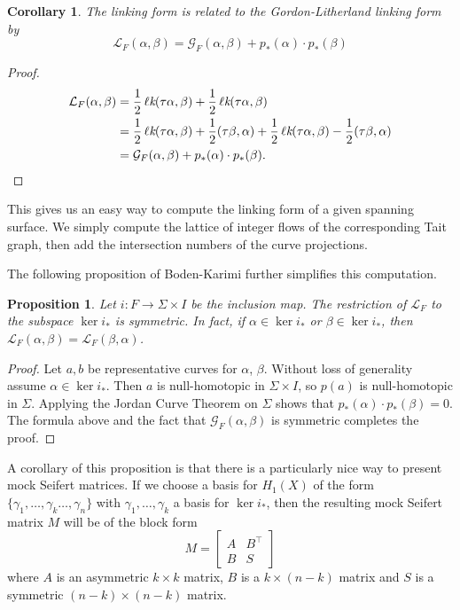 \documentclass[12pt]{report}
\newcommand{\lk}{\operatorname{\ell\textit{k}}}
\newtheorem*{proposition}{Proposition}
\newtheorem*{corollary}{Corollary}
\theoremstyle{upright}
\begin{document}
\begin{corollary}
The linking form is related to the Gordon-Litherland linking form by
\[\mathcal{L}_{F}(\alpha, \beta) = \mathcal{G}_{F}(\alpha, \beta) + p_{*}(\alpha) \cdot p_{*}(\beta)\]
\end{corollary}

\begin{proof}
\begin{align*}
\mathcal{L}_{F}(\alpha, \beta) & = \dfrac{1}{2}\lk(\tau \alpha, \beta) + \dfrac{1}{2}\lk(\tau \alpha, \beta)\\
& = \dfrac{1}{2}\lk(\tau \alpha, \beta) + \dfrac{1}{2}(\tau \beta, \alpha) + \dfrac{1}{2}\lk(\tau \alpha, \beta) - \dfrac{1}{2}(\tau \beta, \alpha)\\
& = \mathcal{G}_{F}(\alpha, \beta) + p_{*}(\alpha) \cdot p_{*}(\beta). \qedhere
\end{align*}
\end{proof}

This gives us an easy way to compute the linking form of a given spanning surface. We simply compute the lattice of integer flows of the corresponding Tait graph, then add the intersection numbers of the curve projections.

The following proposition of Boden-Karimi \cite[Remark 3.2]{mock-seifert-matrices} further simplifies this computation.

\begin{proposition}
	Let $i: F \longrightarrow \Sigma \times I$ be the inclusion map. The restriction of $\mathcal{L}_{F}$ to the subspace $\ker i_{*}$ is symmetric. In fact, if $\alpha \in \ker i_{*}$ or $\beta \in \ker i_{*}$, then $\mathcal{L}_{F}(\alpha, \beta) = \mathcal{L}_{F}(\beta, \alpha)$.
\end{proposition}

\begin{proof}
	Let $a, b$ be representative curves for $\alpha$, $\beta$. Without loss of generality assume $\alpha \in \ker i_{*}$. Then $a$ is null-homotopic in $\Sigma \times I$, so $p(a)$ is null-homotopic in $\Sigma$. Applying the Jordan Curve Theorem on $\Sigma$  shows that $p_{*}(\alpha) \cdot p_{*}(\beta) = 0$. The formula above and the fact that $\mathcal{G}_{F}(\alpha, \beta)$ is symmetric completes the proof.
\end{proof}

A corollary of this proposition is that there is a particularly nice way to present mock Seifert matrices. If we choose a basis for $H_{1}(X)$ of the form $\{\gamma_{1}, \dots, \gamma_{k} \dots, \gamma_{n}\}$ with ${\gamma_{1}, \dots, \gamma_{k}}$ a basis for $\ker i_{*}$, then the resulting mock Seifert matrix $M$ will be of the block form
\[M = \begin{bmatrix}
	A & B^{\top} \\
	B & S
\end{bmatrix}\]
where $A$ is an asymmetric $k \times k$ matrix, $B$ is a $k \times (n - k)$ matrix and $S$ is a symmetric $(n - k) \times (n - k)$ matrix.
\end{document}

